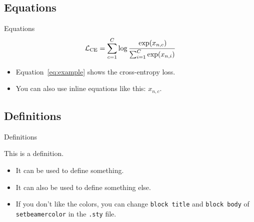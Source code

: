 \documentclass[
	10pt, %
	aspectratio=169, %
]{beamer}
\begin{document}
\subsection{Equations}
\begin{frame}{Equations}
	\begin{equation}
		\label{eq:example}
		\mathcal{L}_{\text{CE}} = \sum_{c=1}^{C} \log \cfrac{\exp(x_{n,c})}{\sum_{i=1}^{C} \exp(x_{n,i})}
	\end{equation}
	\begin{itemize}
		\item Equation~\ref{eq:example} shows the cross-entropy loss.
		\item You can also use inline equations like this: $x_{n,c}$.
	\end{itemize}
\end{frame}

\subsection{Definitions}
\begin{frame}{Definitions}
	\begin{definition}
		This is a definition.
		\begin{itemize}
			\item It can be used to define something.
			\item It can also be used to define something else.
			\item If you don't like the colors, you can change \texttt{block title} and  \texttt{block body} of \texttt{setbeamercolor} in the \texttt{.sty} file.\end{itemize}
	\end{definition}
\end{frame}
\end{document}
